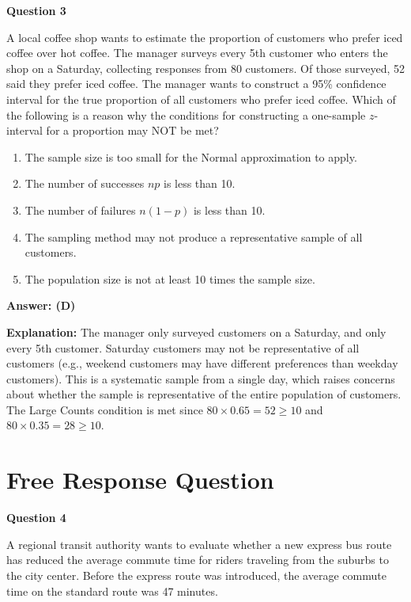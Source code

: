 \documentclass[12pt]{article}
\newcommand{\answerkey}[1]{\textbf{Answer: #1}}
\begin{document}
\newpage

\noindent\textbf{Question 3}

A local coffee shop wants to estimate the proportion of customers who prefer iced coffee over hot coffee. The manager surveys every 5th customer who enters the shop on a Saturday, collecting responses from 80 customers. Of those surveyed, 52 said they prefer iced coffee. The manager wants to construct a 95\% confidence interval for the true proportion of all customers who prefer iced coffee. Which of the following is a reason why the conditions for constructing a one-sample $z$-interval for a proportion may NOT be met?

\begin{enumerate}[label=(\Alph*)]
    \item The sample size is too small for the Normal approximation to apply.
    \item The number of successes $np$ is less than 10.
    \item The number of failures $n(1-p)$ is less than 10.
    \item The sampling method may not produce a representative sample of all customers.
    \item The population size is not at least 10 times the sample size.
\end{enumerate}

\answerkey{(D)}

\textbf{Explanation:} The manager only surveyed customers on a Saturday, and only every 5th customer. Saturday customers may not be representative of all customers (e.g., weekend customers may have different preferences than weekday customers). This is a systematic sample from a single day, which raises concerns about whether the sample is representative of the entire population of customers. The Large Counts condition is met since $80 \times 0.65 = 52 \geq 10$ and $80 \times 0.35 = 28 \geq 10$.

\newpage

\section*{Free Response Question}

\noindent\textbf{Question 4}

A regional transit authority wants to evaluate whether a new express bus route has reduced the average commute time for riders traveling from the suburbs to the city center. Before the express route was introduced, the average commute time on the standard route was 47 minutes.
\end{document}
